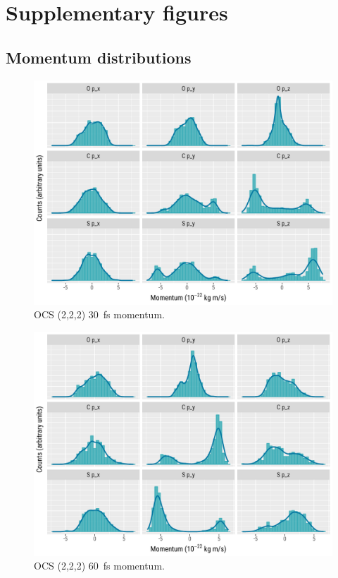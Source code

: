 \chapter{Supplementary figures}\label{appx:supplementaryFigures}

\section{Momentum distributions}
\begin{figure}
  \centering
  \includegraphics[width=\textwidth]{Plots/OCS22230fsMomentum}
  \caption[OCS (2,2,2) \SI{30}{\fs} momentum.]
  {OCS (2,2,2) \SI{30}{\fs} momentum.}
  \label{fig:OCS22230fsMomentum}
\end{figure}

\begin{figure}
  \centering
  \includegraphics[width=\textwidth]{Plots/OCS22260fsMomentum}
  \caption[OCS (2,2,2) \SI{60}{\fs} momentum.]
  {OCS (2,2,2) \SI{60}{\fs} momentum.}
  \label{fig:OCS22260fsMomentum}
\end{figure}

